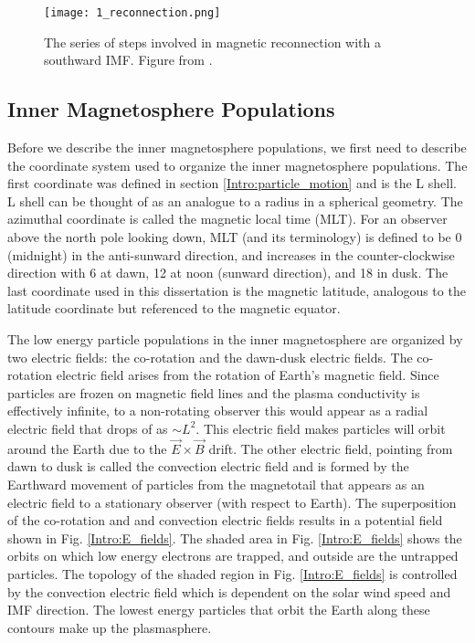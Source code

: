 \begin{figure}
\texttt{[image: 1\_reconnection.png]}
\caption{The series of steps involved in magnetic reconnection with a southward IMF. Figure from \citet{Baumjohann1997}.}
\label{Intro:reconnection}
\end{figure}

\subsection{Inner Magnetosphere Populations}\label{Intro:inner_mag}
Before we describe the inner magnetosphere populations, we first need to describe the coordinate system used to organize the inner magnetosphere populations. The first coordinate was defined in section \ref{Intro:particle_motion} and is the L shell. L shell can be thought of as an analogue to a radius in a spherical geometry. The azimuthal coordinate is called the magnetic local time (MLT). For an observer above the north pole looking down, MLT (and its terminology) is defined to be 0 (midnight) in the anti-sunward direction, and increases in the counter-clockwise direction with 6 at dawn, 12 at noon (sunward direction), and 18 in dusk. The last coordinate used in this dissertation is the magnetic latitude, analogous to the latitude coordinate but referenced to the magnetic equator. 

The low energy particle populations in the inner magnetosphere are organized by two electric fields: the co-rotation and the dawn-dusk electric fields. The co-rotation electric field arises from the rotation of Earth's magnetic field. Since particles are frozen on magnetic field lines and the plasma conductivity is effectively infinite, to a non-rotating observer this would appear as a radial electric field that drops of as $\sim L^2$. This electric field makes particles will orbit around the Earth due to the $\vec{E} \times \vec{B}$ drift. The other electric field, pointing from dawn to dusk is called the convection electric field and is formed by the Earthward movement of particles from the magnetotail that appears as an electric field to a stationary observer (with respect to Earth). The superposition of the co-rotation and and convection electric fields results in a potential field shown in Fig. \ref{Intro:E_fields}. The shaded area in Fig. \ref{Intro:E_fields} shows the orbits on which low energy electrons are trapped, and outside are the untrapped particles. The topology of the shaded region in Fig. \ref{Intro:E_fields} is controlled by the convection electric field which is dependent on the solar wind speed and IMF direction. The lowest energy particles that orbit the Earth along these contours make up the plasmasphere.


